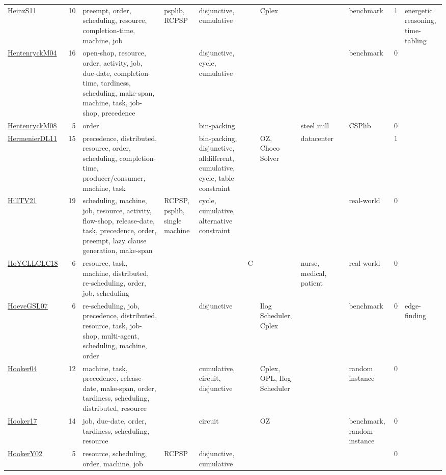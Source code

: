 {\begin{longtable}{p{3cm}rp{4cm}p{1.5cm}p{2cm}p{1.5cm}p{1.5cm}p{1.5cm}p{1.5cm}p{2cm}rp{1.5cm}}
\href{papers/HeinzS11.pdf}{HeinzS11}~\cite{HeinzS11} & 10 & preempt, order, scheduling, resource, completion-time, machine, job & psplib, RCPSP & disjunctive, cumulative &  & Cplex &  &  & benchmark & 1 & energetic reasoning, time-tabling\\
\href{papers/HentenryckM04.pdf}{HentenryckM04}~\cite{HentenryckM04} & 16 & open-shop, resource, order, activity, job, due-date, completion-time, tardiness, scheduling, make-span, machine, task, job-shop, precedence &  & disjunctive, cycle, cumulative &  &  &  &  & benchmark & 0 & \\
\href{papers/HentenryckM08.pdf}{HentenryckM08}~\cite{HentenryckM08} & 5 & order &  & bin-packing &  &  & steel mill &  & CSPlib & 0 & \\
\href{papers/HermenierDL11.pdf}{HermenierDL11}~\cite{HermenierDL11} & 15 & precedence, distributed, resource, order, scheduling, completion-time, producer/consumer, machine, task &  & bin-packing, disjunctive, alldifferent, cumulative, cycle, table constraint &  & OZ, Choco Solver & datacenter &  &  & 1 & \\
\href{papers/HillTV21.pdf}{HillTV21}~\cite{HillTV21} & 19 & scheduling, machine, job, resource, activity, flow-shop, release-date, task, precedence, order, preempt, lazy clause generation, make-span & RCPSP, psplib, single machine & cycle, cumulative, alternative constraint &  &  &  &  & real-world & 0 & \\
\href{papers/HoYCLLCLC18.pdf}{HoYCLLCLC18}~\cite{HoYCLLCLC18} & 6 & resource, task, machine, distributed, re-scheduling, order, job, scheduling &  &  & C  &  & nurse, medical, patient &  & real-world & 0 & \\
\href{papers/HoeveGSL07.pdf}{HoeveGSL07}~\cite{HoeveGSL07} & 6 & re-scheduling, job, precedence, distributed, resource, task, job-shop, multi-agent, scheduling, machine, order &  & disjunctive &  & Ilog Scheduler, Cplex &  &  & benchmark & 0 & edge-finding\\
\href{papers/Hooker04.pdf}{Hooker04}~\cite{Hooker04} & 12 & machine, task, precedence, release-date, make-span, order, tardiness, scheduling, distributed, resource &  & cumulative, circuit, disjunctive &  & Cplex, OPL, Ilog Scheduler &  &  & random instance & 0 & \\
\href{papers/Hooker17.pdf}{Hooker17}~\cite{Hooker17} & 14 & job, due-date, order, tardiness, scheduling, resource &  & circuit &  & OZ &  &  & benchmark, random instance & 0 & \\
\href{papers/HookerY02.pdf}{HookerY02}~\cite{HookerY02} & 5 & resource, scheduling, order, machine, job & RCPSP & disjunctive, cumulative &  &  &  &  &  & 0 & \\

\end{longtable}}
